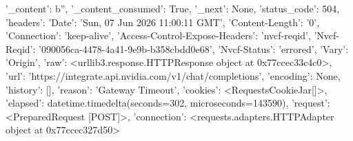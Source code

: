 
{'_content': b'', '_content_consumed': True, '_next': None, 'status_code': 504, 'headers': {'Date': 'Sun, 07 Jun 2026 11:00:11 GMT', 'Content-Length': '0', 'Connection': 'keep-alive', 'Access-Control-Expose-Headers': 'nvcf-reqid', 'Nvcf-Reqid': '090056ca-4478-4a41-9e9b-b358cbdd0e68', 'Nvcf-Status': 'errored', 'Vary': 'Origin'}, 'raw': <urllib3.response.HTTPResponse object at 0x77ccec33c4c0>, 'url': 'https://integrate.api.nvidia.com/v1/chat/completions', 'encoding': None, 'history': [], 'reason': 'Gateway Timeout', 'cookies': <RequestsCookieJar[]>, 'elapsed': datetime.timedelta(seconds=302, microseconds=143590), 'request': <PreparedRequest [POST]>, 'connection': <requests.adapters.HTTPAdapter object at 0x77ccec327d50>}
